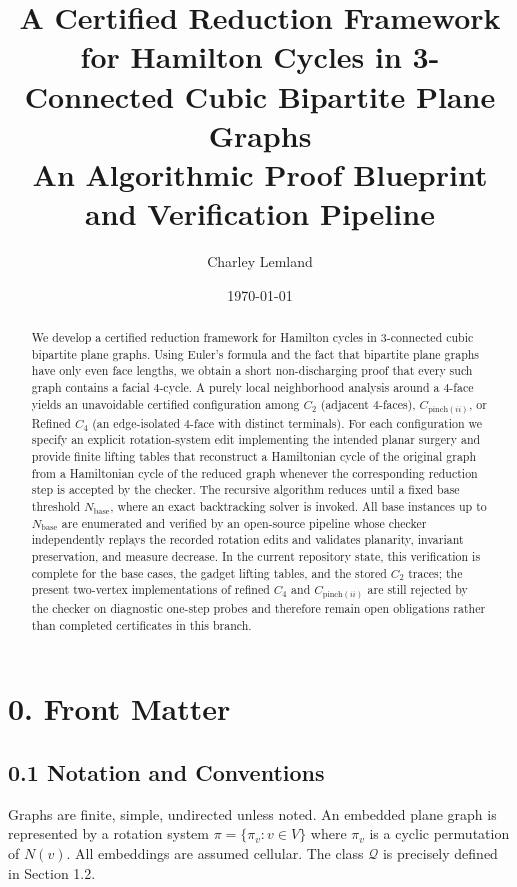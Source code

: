 \documentclass[12pt]{article}
\title{A Certified Reduction Framework for Hamilton Cycles in 3-Connected Cubic Bipartite Plane Graphs\\[0.5em]
\large An Algorithmic Proof Blueprint and Verification Pipeline}
\author{Charley Lemland}
\date{\today}
\theoremstyle{definition}
\begin{document}
\maketitle

\begin{abstract}
We develop a certified reduction framework for Hamilton cycles in $3$-connected cubic bipartite plane graphs.
Using Euler's formula and the fact that bipartite plane graphs have only even face lengths, we obtain a short
non-discharging proof that every such graph contains a facial $4$-cycle. A purely local neighborhood analysis
around a $4$-face yields an unavoidable certified configuration among $C_2$ (adjacent $4$-faces), $C_{\text{pinch}(ii)}$,
or Refined $C_4$ (an edge-isolated $4$-face with distinct terminals). For each configuration we specify an explicit
rotation-system edit implementing the intended planar surgery and provide finite lifting tables that reconstruct a Hamiltonian cycle of the original graph
from a Hamiltonian cycle of the reduced graph whenever the corresponding reduction step is accepted by the checker. The recursive algorithm reduces until a fixed base threshold
$N_{\mathrm{base}}$, where an exact backtracking solver is invoked. All base instances up to $N_{\mathrm{base}}$ are
enumerated and verified by an open-source pipeline whose checker independently replays the recorded rotation edits
and validates planarity, invariant preservation, and measure decrease. In the current repository state, this verification is complete for the base cases, the gadget lifting tables, and the stored $C_2$ traces; the present two-vertex implementations of refined $C_4$ and $C_{\text{pinch}(ii)}$ are still rejected by the checker on diagnostic one-step probes and therefore remain open obligations rather than completed certificates in this branch.
\end{abstract}

\section*{0. Front Matter}

\subsection*{0.1 Notation and Conventions}
Graphs are finite, simple, undirected unless noted. An embedded plane graph is represented by a rotation system $\pi = \{\pi_v : v \in V\}$ where $\pi_v$ is a cyclic permutation of $N(v)$. All embeddings are assumed cellular. The class $\mathcal{Q}$ is precisely defined in Section 1.2.
\end{document}
